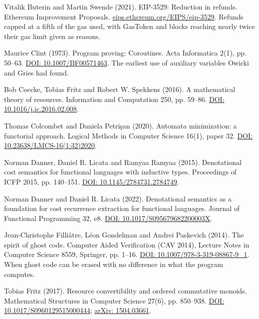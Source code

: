 \documentclass[11pt,twoside]{article}
\theoremstyle{thielethm}
\theoremstyle{thieledef}
\theoremstyle{thieledef}
\theoremstyle{thieledef}
\theoremstyle{thielethm}
\theoremstyle{thieleobs}
\theoremstyle{thielethm}
\begin{document}
\noindent Vitalik Buterin and Martin Swende (2021). EIP-3529: Reduction in refunds. Ethereum Improvement Proposals. \href{https://eips.ethereum.org/EIPS/eip-3529}{eips.ethereum.org/EIPS/eip-3529}. Refunds capped at a fifth of the gas used, with GasToken and blocks reaching nearly twice their gas limit given as reasons.
\par\medskip

\noindent Maurice Clint (1973). Program proving: Coroutines. Acta Informatica 2(1), pp. 50--63. \href{https://doi.org/10.1007/BF00571463}{DOI: 10.1007/BF00571463}. The earliest use of auxiliary variables Owicki and Gries had found.
\par\medskip

\noindent Bob Coecke, Tobias Fritz and Robert W. Spekkens (2016). A mathematical theory of resources. Information and Computation 250, pp. 59--86. \href{https://doi.org/10.1016/j.ic.2016.02.008}{DOI: 10.1016/j.ic.2016.02.008}.
\par\medskip

\noindent Thomas Colcombet and Daniela Petri\c{s}an (2020). Automata minimization: a functorial approach. Logical Methods in Computer Science 16(1), paper 32. \href{https://doi.org/10.23638/LMCS-16(1:32)2020}{DOI: 10.23638/LMCS-16(1:32)2020}.
\par\medskip

\noindent Norman Danner, Daniel R. Licata and Ramyaa Ramyaa (2015). Denotational cost semantics for functional languages with inductive types. Proceedings of ICFP 2015, pp. 140--151. \href{https://doi.org/10.1145/2784731.2784749}{DOI: 10.1145/2784731.2784749}.
\par\medskip

\noindent Norman Danner and Daniel R. Licata (2022). Denotational semantics as a foundation for cost recurrence extraction for functional languages. Journal of Functional Programming 32, e8. \href{https://doi.org/10.1017/S095679682200003X}{DOI: 10.1017/S095679682200003X}.
\par\medskip

\noindent Jean-Christophe Filli\^atre, L\'eon Gondelman and Andrei Paskevich (2014). The spirit of ghost code. Computer Aided Verification (CAV 2014), Lecture Notes in Computer Science 8559, Springer, pp. 1--16. \href{https://doi.org/10.1007/978-3-319-08867-9_1}{DOI: 10.1007/978-3-319-08867-9\_1}. When ghost code can be erased with no difference in what the program computes.
\par\medskip

\noindent Tobias Fritz (2017). Resource convertibility and ordered commutative monoids. Mathematical Structures in Computer Science 27(6), pp. 850--938. \href{https://doi.org/10.1017/S0960129515000444}{DOI: 10.1017/S0960129515000444}; \href{https://arxiv.org/abs/1504.03661}{arXiv: 1504.03661}.
\par\medskip
\end{document}

